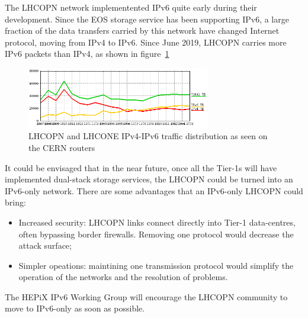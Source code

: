 
The LHCOPN network implementented IPv6 quite early during their development. 
Since the EOS storage service has been supporting IPv6, a large fraction of the data transfers carried by this network have changed Internet protocol, moving from IPv4 to IPv6. Since June 2019, LHCOPN carries more IPv6 packets than IPv4, as shown in figure~\ref{fig:lhcopne-traffic}

\begin{figure}[h]
\centering
\includegraphics[width=8cm]{lhcopne-traffic.png}
\caption{LHCOPN and LHCONE IPv4-IPv6 traffic distribution as seen on the CERN routers\cite{RefLHCOPNEv4v6}  }
\label{fig:lhcopne-traffic}
\end{figure}


It could be envisaged that in the near future, once all the Tier-1s will have implemented dual-stack storage services, the LHCOPN could be turned into an IPv6-only network. There are some advantages that an IPv6-only LHCOPN could bring:
\begin{itemize}
  \item Increased security: LHCOPN links connect directly into Tier-1 data-centres, often bypassing border firewalls. Removing one protocol would decrease the attack surface;
  \item Simpler opeations: maintining one transmission protocol would simplify the operation of the networks and the resolution of problems.
\end{itemize}

The HEPiX IPv6 Working Group will encourage the LHCOPN community to move to IPv6-only as soon as possible.




